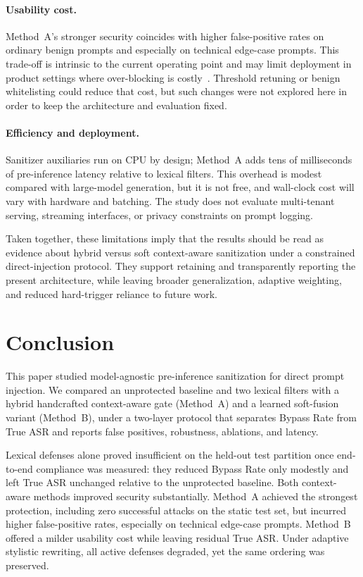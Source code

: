 \documentclass{article}
\begin{document}
\paragraph{Usability cost.}
Method~A's stronger security coincides with higher false-positive rates on ordinary benign prompts and especially on technical edge-case prompts.
This trade-off is intrinsic to the current operating point and may limit deployment in product settings where over-blocking is costly~\cite{bair2025prompt,kholkar2025capture}.
Threshold retuning or benign whitelisting could reduce that cost, but such changes were not explored here in order to keep the architecture and evaluation fixed.

\paragraph{Efficiency and deployment.}
Sanitizer auxiliaries run on CPU by design; Method~A adds tens of milliseconds of pre-inference latency relative to lexical filters.
This overhead is modest compared with large-model generation, but it is not free, and wall-clock cost will vary with hardware and batching.
The study does not evaluate multi-tenant serving, streaming interfaces, or privacy constraints on prompt logging.

Taken together, these limitations imply that the results should be read as evidence about hybrid versus soft context-aware sanitization under a constrained direct-injection protocol.
They support retaining and transparently reporting the present architecture, while leaving broader generalization, adaptive weighting, and reduced hard-trigger reliance to future work.


\section{Conclusion}
\label{sec:conclusion}

This paper studied model-agnostic pre-inference sanitization for direct prompt injection.
We compared an unprotected baseline and two lexical filters with a hybrid handcrafted context-aware gate (Method~A) and a learned soft-fusion variant (Method~B), under a two-layer protocol that separates Bypass Rate from True ASR and reports false positives, robustness, ablations, and latency.

Lexical defenses alone proved insufficient on the held-out test partition once end-to-end compliance was measured: they reduced Bypass Rate only modestly and left True ASR unchanged relative to the unprotected baseline.
Both context-aware methods improved security substantially.
Method~A achieved the strongest protection, including zero successful attacks on the static test set, but incurred higher false-positive rates, especially on technical edge-case prompts.
Method~B offered a milder usability cost while leaving residual True ASR.
Under adaptive stylistic rewriting, all active defenses degraded, yet the same ordering was preserved.
\end{document}
